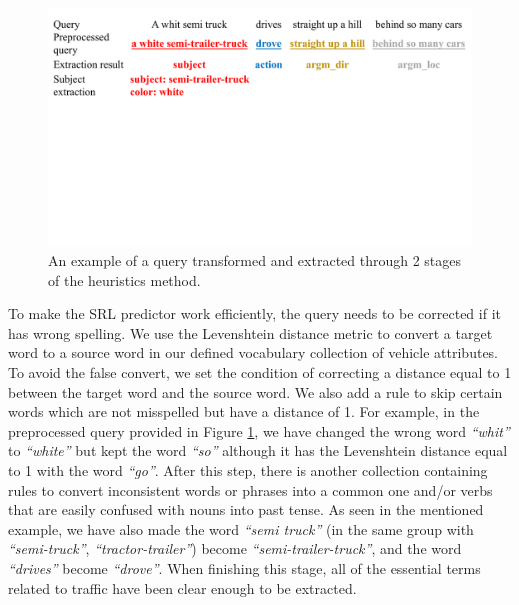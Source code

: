 \begin{figure}[t!]
    \centering
    \includegraphics[width=\textwidth]{resources/images/methods/text_extraction_example.pdf}
    \caption{An example of a query transformed and extracted through 2 stages of the heuristics method.}
    \label{fig:text_extraction_example}
\end{figure}
To make the SRL predictor work efficiently, the query needs to be corrected if it has wrong spelling. We use the Levenshtein distance metric to convert a target word to a source word in our defined vocabulary collection of vehicle attributes. To avoid the false convert, we set the condition of correcting a distance equal to 1 between the target word and the source word. We also add a rule to skip certain words which are not misspelled but have a distance of 1. For example, in the preprocessed query provided in Figure \ref{fig:text_extraction_example}, we have changed the wrong word \textit{“whit”} to \textit{“white”} but kept the word \textit{“so”} although it has the Levenshtein distance equal to 1 with the word \textit{“go”}. After this step, there is another collection containing rules to convert inconsistent words or phrases into a common one and/or verbs that are easily confused with nouns into past tense. As seen in the mentioned example, we have also made the word \textit{“semi truck”} (in the same group with \textit{“semi-truck”}, \textit{“tractor-trailer”}) become \textit{“semi-trailer-truck”}, and the word \textit{“drives”} become \textit{“drove”}. When finishing this stage, all of the essential terms related to traffic have been clear enough to be extracted.
